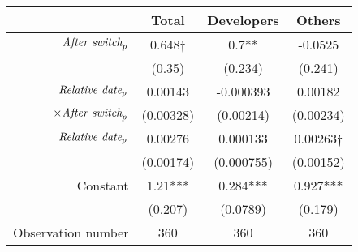 \begin{tabular}{|r|c|c|c|}
\hline
&  Total & Developers & Others \\
\hline
$\mbox{\emph{After switch}}_p$ & 0.648$\dagger$ & 0.7** & -0.0525 \\
 & (0.35) & (0.234) & (0.241) \\
\hline
$\mbox{\emph{Relative date}}_p$ & 0.00143 & -0.000393 & 0.00182 \\
$\times \mbox{\emph{After switch}}_p$ & (0.00328) & (0.00214) & (0.00234) \\
\hline
$\mbox{\emph{Relative date}}_p$ & 0.00276 & 0.000133 & 0.00263$\dagger$ \\
 & (0.00174) & (0.000755) & (0.00152) \\
\hline
Constant & 1.21*** & 0.284*** & 0.927*** \\
 & (0.207) & (0.0789) & (0.179) \\
\hline
Observation number & 360 & 360 & 360 \\
\hline
\end{tabular}